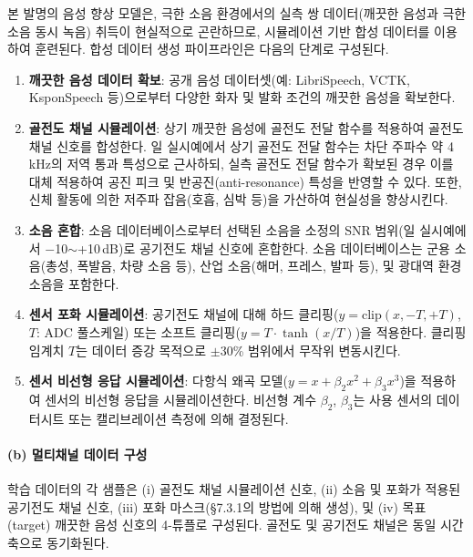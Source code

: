 \documentclass{article}
\begin{document}
본 발명의 음성 향상 모델은, 극한 소음 환경에서의 실측 쌍 데이터(깨끗한 음성과 극한 소음 동시 녹음) 취득이 현실적으로 곤란하므로, 시뮬레이션 기반 합성 데이터를 이용하여 훈련된다. 합성 데이터 생성 파이프라인은 다음의 단계로 구성된다.

\begin{enumerate}
    \item \textbf{깨끗한 음성 데이터 확보}: 공개 음성 데이터셋(예: LibriSpeech, VCTK, KsponSpeech 등)으로부터 다양한 화자 및 발화 조건의 깨끗한 음성을 확보한다.
    
    \item \textbf{골전도 채널 시뮬레이션}: 상기 깨끗한 음성에 골전도 전달 함수를 적용하여 골전도 채널 신호를 합성한다. 일 실시예에서 상기 골전도 전달 함수는 차단 주파수 약 4\,kHz의 저역 통과 특성으로 근사하되, 실측 골전도 전달 함수가 확보된 경우 이를 대체 적용하여 공진 피크 및 반공진(anti-resonance) 특성을 반영할 수 있다. 또한, 신체 활동에 의한 저주파 잡음(호흡, 심박 등)을 가산하여 현실성을 향상시킨다.
    
    \item \textbf{소음 혼합}: 소음 데이터베이스로부터 선택된 소음을 소정의 SNR 범위(일 실시예에서 $-$10$\sim$+10\,dB)로 공기전도 채널 신호에 혼합한다. 소음 데이터베이스는 군용 소음(총성, 폭발음, 차량 소음 등), 산업 소음(해머, 프레스, 발파 등), 및 광대역 환경 소음을 포함한다.
    
    \item \textbf{센서 포화 시뮬레이션}: 공기전도 채널에 대해 하드 클리핑($y = \mathrm{clip}(x, -T, +T)$, $T$: ADC 풀스케일) 또는 소프트 클리핑($y = T \cdot \tanh(x/T)$)을 적용한다. 클리핑 임계치 $T$는 데이터 증강 목적으로 $\pm$30\% 범위에서 무작위 변동시킨다.
    
    \item \textbf{센서 비선형 응답 시뮬레이션}: 다항식 왜곡 모델($y = x + \beta_2 x^2 + \beta_3 x^3$)을 적용하여 센서의 비선형 응답을 시뮬레이션한다. 비선형 계수 $\beta_2$, $\beta_3$는 사용 센서의 데이터시트 또는 캘리브레이션 측정에 의해 결정된다.
\end{enumerate}

\paragraph{(b) 멀티채널 데이터 구성}

학습 데이터의 각 샘플은 (i) 골전도 채널 시뮬레이션 신호, (ii) 소음 및 포화가 적용된 공기전도 채널 신호, (iii) 포화 마스크(§7.3.1의 방법에 의해 생성), 및 (iv) 목표(target) 깨끗한 음성 신호의 4-튜플로 구성된다. 골전도 및 공기전도 채널은 동일 시간축으로 동기화된다.
\end{document}
